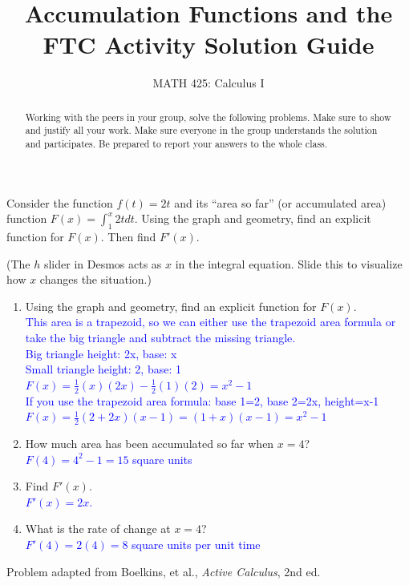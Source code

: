 \documentclass{ximera}
\title{Accumulation Functions and the FTC Activity Solution Guide}
\author{MATH 425: Calculus I}
\begin{document}
\begin{abstract}
   Working with the peers in your group, solve the following problems. Make sure to show and justify all your work. Make sure everyone in the group understands the solution and participates. Be prepared to report your answers to the whole class. 
\end{abstract}
\maketitle


\begin{exercise}
    Consider the function $f(t)=2t$ and its ``area so far'' (or accumulated area) function $F(x)=\int_1^x 2tdt$.  Using the graph and geometry, find an explicit function for $F(x)$.  Then find $F'(x)$.
    \begin{center}
    \end{center}
    (The $h$ slider in Desmos acts as $x$ in the integral equation.  Slide this to visualize how $x$ changes the situation.)\\
    \begin{enumerate}
        \item Using the graph and geometry, find an explicit function for $F(x)$.  \\
        \textcolor{blue}{This area is a trapezoid, so we can either use the trapezoid area formula or take the big triangle and subtract the missing triangle. \\
    Big triangle height: 2x, base: x\\
    Small triangle height: 2, base: 1\\
     $F(x)=\frac12(x)(2x)-\frac12(1)(2)=x^2-1$\\
     If you use the trapezoid area formula: base 1=2, base 2=2x, height=x-1\\
     $F(x)=\frac12(2+2x)(x-1)=(1+x)(x-1)=x^2-1$}
        \item How much area has been accumulated so far when $x=4$?\\
        \textcolor{blue}{$F(4)=4^2-1=15$ square units}
        \item Find $F'(x)$.\\
        \textcolor{blue}{$F'(x)=2x$.}
        \item What is the rate of change at $x=4$?\\
        \textcolor{blue}{$F'(4)=2(4)=8$ square units per unit time}
    \end{enumerate}
    Problem adapted from Boelkins, et al., \textit{Active Calculus}, 2nd ed.

\end{exercise}
\end{document}
